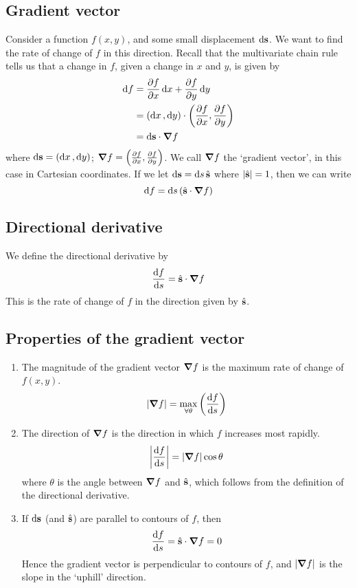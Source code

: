\subsection{Gradient vector}
Consider a function \(f(x, y)\), and some small displacement \(\dd \vb s\).
We want to find the rate of change of \(f\) in this direction.
Recall that the multivariate chain rule tells us that a change in \(f\), given a change in \(x\) and \(y\), is given by
\begin{align*}
	\dd{f} & = \frac{\partial f}{\partial x} \dd{x} + \frac{\partial f}{\partial y}\dd{y}                         \\
	       & = (\dd{x}, \dd{y}) \cdot \left( \frac{\partial f}{\partial x}, \frac{\partial f}{\partial y} \right) \\
	       & = \dd \vb s \cdot \grad f
\end{align*}
where \(\dd \vb s = (\dd{x}, \dd{y})\); \(\grad f = \left( \frac{\partial f}{\partial x}, \frac{\partial f}{\partial y} \right)\).
We call \(\grad f\) the `gradient vector', in this case in Cartesian coordinates.
If we let \(\dd \vb s = \dd{s} \hat{\vb s}\) where \(\abs{\hat{\vb s}} = 1\), then we can write
\[
	\dd{f} = \dd{s} (\hat{\vb s}\cdot \grad f)
\]

\subsection{Directional derivative}
We define the directional derivative by
\[
	\frac{\dd{f}}{\dd{s}} = \hat{\vb s} \cdot \grad f
\]
This is the rate of change of \(f\) in the direction given by \(\hat{\vb s}\).

\subsection{Properties of the gradient vector}
\begin{enumerate}
	\item The magnitude of the gradient vector \(\grad f\) is the maximum rate of change of \(f(x, y)\).
	      \[
		      \abs{\grad f} = \max\limits_{\forall \theta} \left( \frac{\dd{f}}{\dd{s}} \right)
	      \]
	\item The direction of \(\grad f\) is the direction in which \(f\) increases most rapidly.
	      \[
		      \abs{\frac{\dd{f}}{\dd{s}}} = \abs{\grad f}\cos\theta
	      \]
	      where \(\theta\) is the angle between \(\grad f\) and \(\hat{\vb s}\), which follows from the definition of the directional derivative.
	\item If \(\dd \vb s\) (and \(\hat{\vb s}\)) are parallel to contours of \(f\), then
	      \[
		      \frac{\dd{f}}{\dd{s}} = \hat{\vb s} \cdot \grad f = 0
	      \]
	      Hence the gradient vector is perpendicular to contours of \(f\), and \(\abs{\grad f}\) is the slope in the `uphill' direction.
\end{enumerate}

